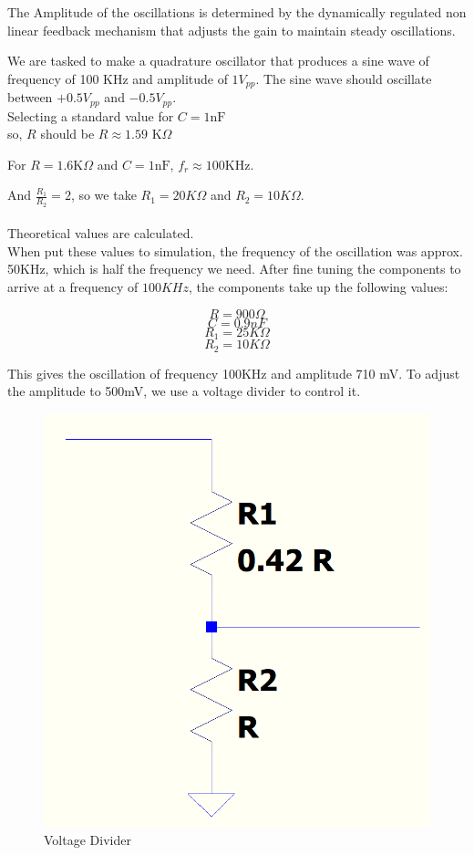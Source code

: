 The Amplitude of the oscillations is determined by the dynamically regulated non linear feedback mechanism that adjusts the gain to maintain steady oscillations.

We are tasked to make a quadrature oscillator that produces a sine wave of frequency of 100 KHz and amplitude of $1V_{pp}$. The sine wave should oscillate between $+0.5V_{pp}$ and $-0.5V_{pp}$.\\

Selecting a standard value for $C = 1 \text{nF}$\\
so, $R$ should be $R \approx 1.59\text{ K}\Omega$

For $ R = 1.6 \text{K}\Omega$ and $C = 1\text{nF}$, $f_r \approx 100\text{KHz}$.

And $\frac{R_1}{R_2} = 2$, so we take $R_1 = 20 K\Omega$ and $R_2 = 10 K\Omega$.\\
\\
Theoretical values are calculated.\\
When put these values to simulation, the frequency of the oscillation was approx. 50KHz, which is half the frequency we need. After fine tuning the components to arrive at a frequency of $100KHz$, the components take up the following values:

$$R = 900\Omega$$
$$C = 0.9nF$$
$$R_1 = 25K\Omega$$
$$R_2 = 10K\Omega$$

This gives the oscillation of frequency 100KHz and amplitude 710 mV. To adjust the amplitude to 500mV, we use a voltage divider to control it.

\begin{figure}[H]
    \centering
    \includegraphics[width=0.6\linewidth]{Voltage-divider.png}
    \caption{Voltage Divider}
    \label{fig:voltage-div}
\end{figure}

